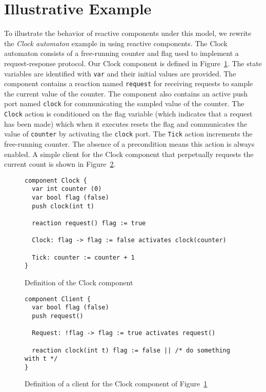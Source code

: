 \section{Illustrative Example}
To illustrate the behavior of reactive components under this model, we rewrite the \emph{Clock automaton} example in \cite{nancy1996distributed} using reactive components.
The Clock automaton consists of a free-running counter and flag used to implement a request-response protocol.
Our Clock component is defined in Figure~\ref{clock_component}.
The state variables are identified with \verb+var+ and their initial values are provided.
The component contains a reaction named \verb+request+ for receiving requests to sample the current value of the counter.
The component also contains an active push port named \verb+clock+ for communicating the sampled value of the counter.
The \verb+Clock+ action is conditioned on the flag variable (which indicates that a request has been made) which when it executes resets the flag and communicates the value of \verb+counter+ by activating the \verb+clock+ port.
The \verb+Tick+ action increments the free-running counter.
The absence of a precondition means this action is always enabled.
A simple client for the Clock component that perpetually requests the current count is shown in Figure~\ref{client_component}.

\begin{figure}
\begin{verbatim}
component Clock {
  var int counter (0)
  var bool flag (false)
  push clock(int t)

  reaction request() flag := true

  Clock: flag -> flag := false activates clock(counter)

  Tick: counter := counter + 1
}
\end{verbatim}
\caption{Definition of the Clock component}
\label{clock_component}
\end{figure}

\begin{figure}
\begin{verbatim}
component Client {
  var bool flag (false)
  push request()

  Request: !flag -> flag := true activates request()

  reaction clock(int t) flag := false || /* do something with t */
}
\end{verbatim}
\caption{Definition of a client for the Clock component of Figure~\ref{clock_component}}
\label{client_component}
\end{figure}

